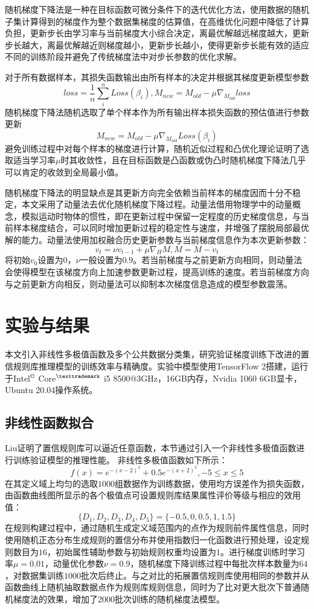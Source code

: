 \documentclass{cjc}
\begin{document}
随机梯度下降法\cite{a17}是一种在目标函数可微分条件下的迭代优化方法，使用数据的随机子集计算得到的梯度作为整个数据集梯度的估算值，在高维优化问题中降低了计算负担，更新步长由学习率与当前梯度大小综合决定，离最优解越远梯度越大，更新步长越大，离最优解越近则梯度越小，更新步长越小，使得更新步长能有效的适应不同的训练阶段并避免了传统梯度法中对步长参数的优化求解。

对于所有数据样本，其损失函数输出由所有样本的决定并根据其梯度更新模型参数
$$loss=\frac{1}{n}\sum_i^nLoss(\beta_i),M_{new}=M_{old}-\mu\nabla_{M_{old}}loss$$
随机梯度下降法随机选取了单个样本作为所有输出样本损失函数的预估值进行参数更新
$$M_{new}=M_{old}-\mu\nabla_{M_{old}}Loss(\beta_i)$$
避免训练过程中对每个样本的梯度进行计算，随机近似过程和凸优化理论\cite{a18}证明了选取适当学习率$\mu$时其收敛性，且在目标函数是凸函数或伪凸时随机梯度下降法几乎可以肯定的收敛到全局最小值。

随机梯度下降法的明显缺点是其更新方向完全依赖当前样本的梯度因而十分不稳定，本文采用了动量法\cite{a19}去优化随机梯度下降过程。动量法借用物理学中的动量概念，模拟运动时物体的惯性，即在更新过程中保留一定程度的历史梯度信息，与当前样本梯度结合，可以同时增加更新过程的稳定性与速度，并增强了摆脱局部最优解的能力。动量法使用加权融合历史更新参数与当前梯度信息作为本次更新参数：
$$v_t=\nu v_{t-1}+\mu\nabla_HM,M=M-v_t$$
将初始$v_0$设置为$0$，$\nu$一般设置为$0.9$。若当前梯度与之前更新方向相同，则动量法会使得模型在该梯度方向上加速参数更新过程，提高训练的速度。若当前梯度方向与之前更新方向相反，则动量法可以抑制本次梯度信息造成的模型参数震荡。
\section{实验与结果}
本文引入非线性多极值函数及多个公共数据分类集，研究验证梯度训练下改进的置信规则库推理模型的训练效率与精确度。实验中模型使用TensorFlow 2搭建，运行于Intel$^{\copyright}$ Core$^{\texttrademark}$ i5 8500@3GHz，16GB内存，Nvidia 1060 6GB显卡，Ubuntu 20.04操作系统。
\subsection{非线性函数拟合}
Liu\cite{a15}证明了置信规则库可以逼近任意函数，本节通过引入一个非线性多极值函数进行训练验证模型的推理性能。
非线性多极值函数如下所示：
$$f(x)=e^{-(x-2)^2}+0.5e^{-(x+2)^2},-5\leq x\leq 5$$
在其定义域上均匀的选取$1000$组数据作为训练数据，使用均方误差作为损失函数，由函数曲线图所显示的各个极值点可设置规则库结果属性评价等级与相应的效用值：
$$\{D_1,D_2,D_3,D_4,D_5\}=\{-0.5,0,0.5,1,1.5\}$$
在规则构建过程中，通过随机生成定义域范围内的点作为规则前件属性信息，同时使用随机正态分布生成规则的置信分布并使用指数归一化函数进行预处理，设定规则数目为$16$，初始属性辅助参数与初始规则权重均设置为$1$。进行梯度训练时学习率$\mu=0.01$，动量优化参数$\nu=0.9$，随机梯度下降训练过程中每批次样本数量为$64$，对数据集训练$1000$批次后终止。与之对比的拓展置信规则库使用相同的参数并从函数曲线上随机抽取数据点作为规则库规则信息，同时为了比对更大批次下普通随机梯度法的效果，增加了$2000$批次训练的随机梯度法模型。
\end{document}
